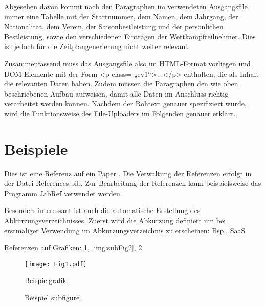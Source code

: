 Abgesehen davon kommt nach den Paragraphen im verwendeten Ausgangsfile immer eine Tabelle mit der Startnummer, dem Namen, dem Jahrgang, der Nationalität, dem Verein, der Saisonbestleistung und der persönlichen Bestleistung, sowie den verschiedenen Einträgen der Wettkampfteilnehmer. Dies ist jedoch für die Zeitplangenerierung nicht weiter relevant.

Zusammenfassend muss das Ausgangsfile also im HTML-Format vorliegen und DOM-Elemente mit der Form <p class= „ev1“>...</p> enthalten, die als Inhalt die relevanten Daten haben. Zudem müssen die Paragraphen den wie oben beschriebenen Aufbau aufweisen, damit alle Daten im Anschluss richtig verarbeitet werden können. 
Nachdem der Rohtext genauer spezifiziert wurde, wird die Funktionsweise des File-Uploaders im Folgenden genauer erklärt.


\section{Beispiele}
Dies  ist eine Referenz auf ein Paper \cite{Kolter2009}. Die Verwaltung der Referenzen erfolgt in der Datei References.bib. Zur Bearbeitung der Referenzen kann beispielsweise das Programm JabRef verwendet werden.

Besonders interessant ist auch die automatische Erstellung des Abkürzungsverzeichnisses. Zuerst wird die Abkürzung definiert um bei erstmaliger Verwendung im Abkürzungsverzeichnis zu erscheinen: \ac{Bsp.}, \ac{SaaS}

Referenzen auf Grafiken: \ref{fig:Fig1}, \ref{img:subFig2}, \ref{img:subFigs}

\begin{figure}
  \centering
  \texttt{[image: Fig1.pdf]}
  \caption{Beispielgrafik}
  \label{fig:Fig1}
\end{figure}


\begin{figure}
  \centering
  \hfill
  \hfill
  \caption{Beispiel subfigure}
  \label{img:subFigs}
\end{figure}



\lstset{language=JAVA, breaklines=true, tabsize=2}



